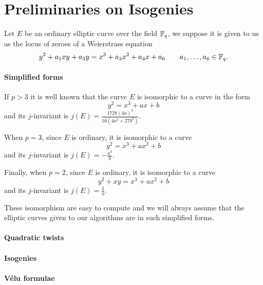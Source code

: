 \section{Preliminaries on Isogenies}

Let $E$ be an ordinary elliptic curve over the field $\mathbb{F}_q$, we
suppose it is given to us as the locus of zeroes of a Weierstrass
equation
\[y^2 + a_1xy + a_3y = x^3 + a_2x^2 + a_4x + a_6
\qquad a_1,\ldots,a_6\in\mathbb{F}_q\text{.}\]

\paragraph{Simplified forms} If $p>3$ it is well known that the curve
$E$ is isomorphic to a curve in the form
\begin{equation}
  \label{eq:weierstrass>3}
  y^2 = x^3 + ax + b
\end{equation}
and its $j$-invariant is $j(E) = \frac{1728(4a)^3}{16(4a^3 + 27b^2)}$.

When $p=3$, since $E$ is ordinary, it is isomorphic to a curve
\begin{equation}
  \label{eq:weierstrass=3}
  y^2 = x^3 + ax^2 + b
\end{equation}
and its $j$-invariant is $j(E) = -\frac{a^3}{b}$.

Finally, when $p=2$, since $E$ is ordinary, it is isomorphic to a curve
\begin{equation}
  \label{eq:weierstrass=2}
  y^2 + xy = x^3 + ax^2 + b
\end{equation}
and its $j$-invariant is $j(E) = \frac{1}{b}$.

These isomorphism are easy to compute and we will always assume that
the elliptic curves given to our algorithms are in such simplified
forms.

\paragraph{Quadratic twists}

\paragraph{Isogenies}

\paragraph{Vélu formulae}




%
